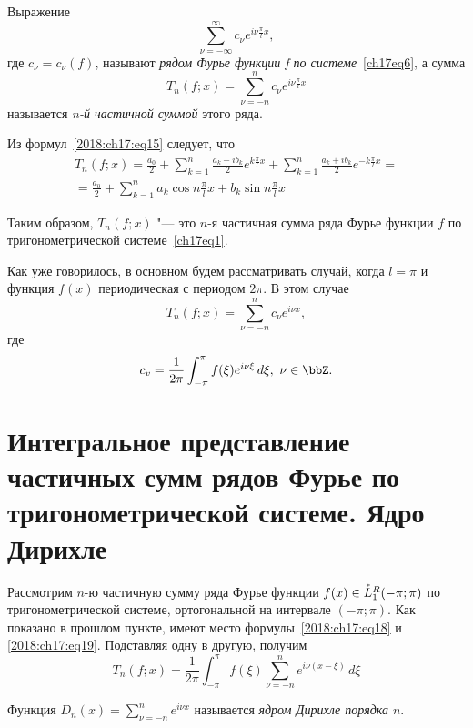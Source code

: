 \begin{defn}
Выражение
\begin{equation}
\sum_{\nu = -\infty}^{\infty} c_{\nu}e^{i\nu\frac{\pi}{l}x},
\end{equation}
где $c_{\nu} = c_{\nu}(f)$, называют \textit{рядом Фурье функции f по системе}~\eqref{ch17eq6}, а сумма
\begin{equation}
T_{n}(f;x) = \sum_{\nu = -n}^{n} c_{\nu}e^{i\nu\frac{\pi}{l}x}
\end{equation}
называется \textit{n-й частичной суммой} этого ряда.
\end{defn}

Из формул~\eqref{2018:ch17:eq15} следует, что
\begin{multline*}
T_{n}(f;x) = \frac{a_0}{2} + \sum_{k = 1}^{n} \frac{a_k-ib_k}{2} e^{k\frac{\pi}{l}x} + \sum_{k = 1}^{n} \frac{a_k + ib_k}{2} e^{-k\frac{\pi}{l}x} =\\ = \frac{a_0}{2} + \sum_{k = 1}^{n} a_{k} \cos n\frac{\pi}{l}x + b_{k} \sin n\frac{\pi}{l}x
\end{multline*}

Таким образом, $T_{n}(f;x)$ "--- это $n$-я частичная сумма ряда Фурье функции $f$ по тригонометрической системе~\eqref{ch17eq1}.

Как уже говорилось, в основном будем рассматривать случай, когда $l=\pi$ и функция $f(x)$ периодическая с периодом $2\pi$. В этом случае
\begin{equation}\label{2018:ch17:eq18}
T_{n}(f;x) = \sum_{\nu = -n}^{n} c_{\nu}e^{i\nu x},
\end{equation}
где
\begin{equation}\label{2018:ch17:eq19}
c_v = \frac{1}{2\pi} \int_{-\pi}^{\pi} f(\xi) e^{i\nu \xi}\,d\xi,\ \nu\in\bbZ.
\end{equation}

\section{Интегральное представление частичных сумм рядов Фурье по тригонометрической системе. Ядро Дирихле}

Рассмотрим $n$-ю частичную сумму ряда Фурье функции $f(x)\in \accentset{*}{L}^{R}_1(-\pi;\pi)$ по тригонометрической системе, ортогональной на интервале $(-\pi;\pi)$. Как показано в прошлом пункте, имеют место формулы~\eqref{2018:ch17:eq18} и  \eqref{2018:ch17:eq19}. Подставляя одну в другую, получим
$$
T_{n}(f;x) = \frac{1}{2\pi} \int_{-\pi}^{\pi} f(\xi) \sum_{\nu = -n}^{n} e^{i\nu(x-\xi)}\,d\xi
$$
\begin{defn}
Функция $D_n(x) = \sum_{\nu = -n}^{n} e^{i\nu x}$ называется \textit{ядром Дирихле порядка $n$}.
\end{defn}

